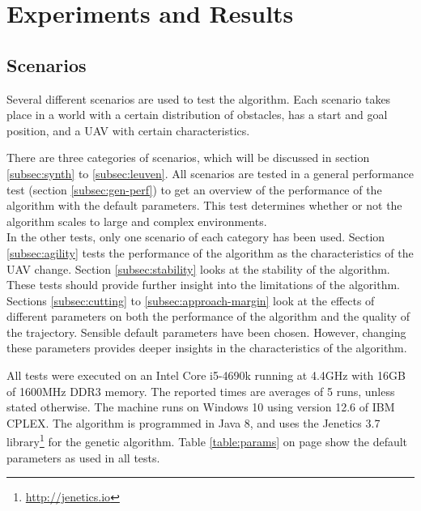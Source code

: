 \chapter{Experiments and Results}
\label{section:analysis}

\section{Scenarios}
Several different scenarios are used to test the algorithm. Each scenario takes place in a world with a certain distribution of obstacles, has a start and goal position, and a UAV with certain characteristics.
\par
There are three categories of scenarios, which will be discussed in section \ref{subsec:synth} to \ref{subsec:leuven}. All scenarios are tested in a general performance test (section \ref{subsec:gen-perf}) to get an overview of the performance of the algorithm with the default parameters. This test determines whether or not the algorithm scales to large and complex environments.\\
In the other tests, only one scenario of each category has been used. Section \ref{subsec:agility} tests the performance of the algorithm as the characteristics of the UAV change. Section \ref{subsec:stability} looks at the stability of the algorithm. These tests should provide further insight into the limitations of the algorithm.\\

Sections \ref{subsec:cutting} to \ref{subsec:approach-margin} look at the effects of different parameters on both the performance of the algorithm and the quality of the trajectory. Sensible default parameters have been chosen. However, changing these parameters provides deeper insights in the characteristics of the algorithm.

All tests were executed on an Intel Core i5-4690k running at 4.4GHz with 16GB of 1600MHz DDR3 memory. The reported times are averages of 5 runs, unless stated otherwise. The machine runs on Windows 10 using version 12.6 of IBM CPLEX. The algorithm is programmed in Java 8, and uses the Jenetics 3.7 library\footnote{\url{http://jenetics.io}} for the genetic algorithm. Table \ref{table:params} on page \pageref{table:params} show the default parameters as used in all tests.

